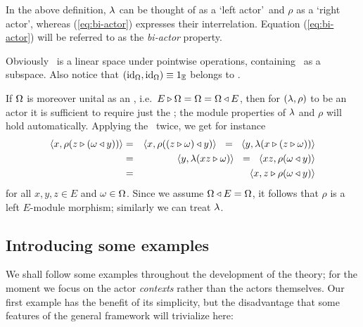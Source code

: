 \begin{remarks} \label{rem:def_actor}
 \item
   In the above definition, $\lambda$ can be thought of as a \lq left actor\rq\ and
   $\rho$ as a \lq right actor\rq, whereas (\ref{eq:bi-actor}) expresses their interrelation.
   Equation (\ref{eq:bi-actor}) will be referred to as the {\em bi-actor\/} property.
 \item
   Obviously \PreE\ is a linear space under pointwise operations,
   containing \ActE\ as a subspace.
   Also notice that $(\mbox{\rm id}_\Omega,\mbox{\rm id}_\Omega) \equiv 1_{\mathbb{E}}$ belongs to \ActE.
 \item
   If $\Omega$ is moreover unital as an \Ebimod, i.e.\ $E \triangleright \Omega = \Omega = \Omega \triangleleft E$,
   then for $(\lambda,\rho)$ to be an actor it is sufficient to require just the \biap;
   the module properties of $\lambda$ and $\rho$ will hold automatically.
   Applying the \biap\ twice, we get for instance
   \begin{eqnarray*}
     \langle x,\rho(z\triangleright (\omega \triangleleft y)) \rangle
          &=&    \langle x,\rho((z\triangleright \omega) \triangleleft y) \rangle
          \hspace{0.6em}=\hspace{0.6em}
                 \langle y,\lambda(x\triangleright (z\triangleright \omega)) \rangle       \\
          &=&    \langle y,\lambda(xz\triangleright \omega) \rangle
          \hspace{0.6em}=\hspace{0.6em}
                 \langle xz,\rho(\omega \triangleleft y) \rangle              \\
          &=&    \langle x,z \triangleright \rho(\omega \triangleleft y) \rangle
   \end{eqnarray*}
   for all $x,y,z \in E$ and $\omega\in \Omega$. Since we assume $\Omega \triangleleft E = \Omega$,
   it follows that $\rho$ is a left $E$-module morphism; similarly we can treat $\lambda$.
\end{remarks}



\subsection{Introducing some examples}

We shall follow some examples throughout the development of the theory;
for the moment we focus on the actor {\em contexts\/} rather than the actors themselves.
Our first example has the benefit of its simplicity, but the disadvantage
that some features of the general framework will trivialize here:

